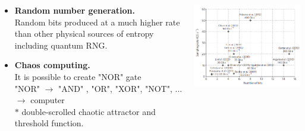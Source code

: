\documentclass[10pt,pdf,hyperref={unicode}, aspectratio=169]{beamer}
\begin{document}
\begin{frame}
\begin{columns}
\begin{column}{0.5\linewidth}		
\begin{itemize}
\item \textbf{Random number generation.}	\\
Random bits produced at a much higher rate than other physical sources of entropy including quantum RNG.	
\item \textbf{Chaos computing.} \\
It is possible to create "NOR" gate\\
"NOR" $\to$ "AND" , "OR", "XOR", "NOT", ... $\to$ computer \\
$\ast$ double-scrolled chaotic attractor and threshold function. 
\end{itemize}
\end{column}
\begin{column}{0.5\linewidth}
	\includegraphics[width=\linewidth]{ChaosRNG.png}
\end{column}
\end{columns}
\end{frame}
\end{document}
